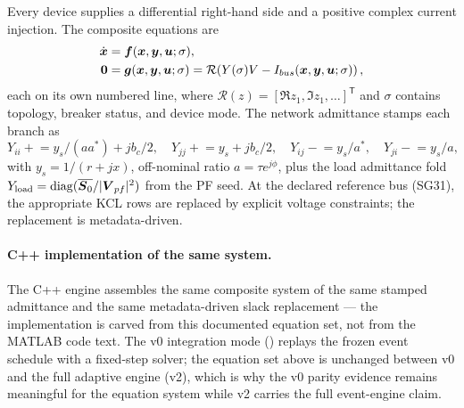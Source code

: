 Every device supplies a differential right-hand side and a positive complex
current injection.  The composite equations are
\begin{align}
\dot{\boldsymbol{x}}&=\boldsymbol{f}(\boldsymbol{x},\boldsymbol{y},\boldsymbol{u};\sigma),\\
\boldsymbol{0}&=\boldsymbol{g}(\boldsymbol{x},\boldsymbol{y},\boldsymbol{u};\sigma)
          =\mathcal R\!\left(Y(\sigma)V-I_{bus}(\boldsymbol{x},\boldsymbol{y},\boldsymbol{u};\sigma)\right),
\end{align}
each on its own numbered line, where
$\mathcal R(z)=[\Re z_1,\Im z_1,\ldots]^{\mathsf T}$ and $\sigma$
contains topology, breaker status, and device mode.  The network admittance
stamps each branch as
\[
Y_{ii}\mathrel{+}=y_s/(a a^*)+jb_c/2,\quad
Y_{jj}\mathrel{+}=y_s+jb_c/2,\quad
Y_{ij}\mathrel{-}=y_s/a^*,\quad
Y_{ji}\mathrel{-}=y_s/a,
\]
with $y_s=1/(r+jx)$, off-nominal ratio $a=\tau e^{j\phi}$, plus the load
admittance fold $Y_{\rm load}=\operatorname{diag}(\overline{\boldsymbol{S}_0}/|\boldsymbol{V}_{pf}|^2)$
from the PF seed.  At the declared reference bus (SG31), the appropriate KCL
rows are replaced by explicit voltage constraints; the replacement is
metadata-driven.

\paragraph{C++ implementation of the same system.}
The C++ engine assembles the same composite system of the same stamped
admittance and the same metadata-driven slack replacement --- the
implementation is carved from this documented equation set, not from the
MATLAB code text.  The v0 integration mode (\intmodes) replays the frozen
event schedule with a fixed-step solver; the equation set above is
unchanged between v0 and the full adaptive engine (v2), which is why the
v0 parity evidence remains meaningful for the equation system while v2
carries the full event-engine claim.
